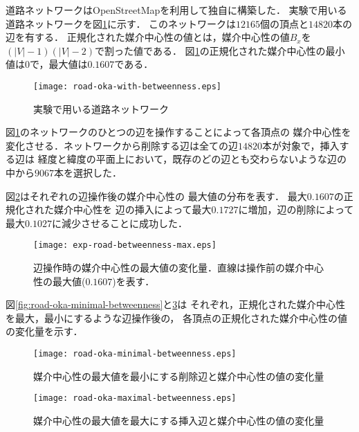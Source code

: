 道路ネットワークはOpenStreetMap\cite{OpenStreetMap}を利用して独自に構築した．
実験で用いる道路ネットワークを図\ref{fig:road-okayama}に示す．
このネットワークは$12165$個の頂点と$14820$本の辺を有する．
正規化された媒介中心性の値とは，媒介中心性の値$B_x$を$(|V|-1)(|V|-2)$で割った値である．
図\ref{fig:road-okayama}の正規化された媒介中心性の最小値は$0$で，最大値は$0.1607$である．

\begin{figure}[tb]
  \centering
  \texttt{[image: road-oka-with-betweenness.eps]}
  \caption{
    実験で用いる道路ネットワーク
  }
  \label{fig:road-okayama}
\end{figure}

図\ref{fig:road-okayama}のネットワークのひとつの辺を操作することによって各頂点の
媒介中心性を変化させる．ネットワークから削除する辺は全ての辺$14820$本が対象で，挿入する辺は
経度と緯度の平面上において，既存のどの辺とも交わらないような辺の中から$9067$本を選択した．

図\ref{fig:exp-road-betweenness-max}はそれぞれの辺操作後の媒介中心性の
最大値の分布を表す．
最大$0.1607$の正規化された媒介中心性を
辺の挿入によって最大$0.1727$に増加，辺の削除によって最大$0.1027$に減少させることに成功した．

\begin{figure}[tb]
  \centering
  \texttt{[image: exp-road-betweenness-max.eps]}
  \caption{辺操作時の媒介中心性の最大値の変化量．直線は操作前の媒介中心性の最大値($0.1607$)を表す．}
  \label{fig:exp-road-betweenness-max}
\end{figure}

図\ref{fig:road-oka-minimal-betweenness}と\ref{fig:road-oka-maximal-betweenness}は
それぞれ，正規化された媒介中心性を最大，最小にするような辺操作後の，
各頂点の正規化された媒介中心性の値の変化量を示す．

\begin{figure}[tb]
   \begin{minipage}{0.48\textwidth}
     \centering
     \texttt{[image: road-oka-minimal-betweenness.eps]}
     \caption{媒介中心性の最大値を最小にする削除辺と媒介中心性の値の変化量}
     \label{fig:road-oka-minimal-betweenness}
   \end{minipage}\hfill
   \begin{minipage}{0.48\textwidth}
     \centering
     \texttt{[image: road-oka-maximal-betweenness.eps]}
     \caption{媒介中心性の最大値を最大にする挿入辺と媒介中心性の値の変化量}
     \label{fig:road-oka-maximal-betweenness}
   \end{minipage}
\end{figure}

